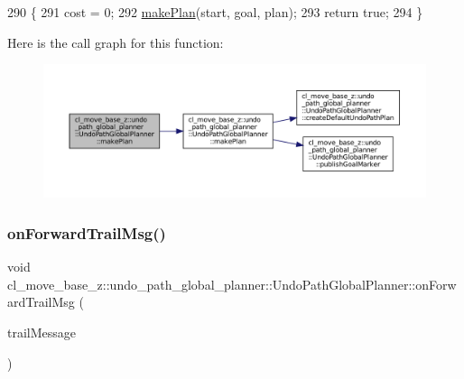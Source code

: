 \begin{DoxyCode}
290         \{
291             cost = 0;
292             \hyperlink{classcl__move__base__z_1_1undo__path__global__planner_1_1UndoPathGlobalPlanner_a46034d27c0811abae440009457a7f8b0}{makePlan}(start, goal, plan);
293             \textcolor{keywordflow}{return} \textcolor{keyword}{true};
294         \}
\end{DoxyCode}
Here is the call graph for this function\+:
\nopagebreak
\begin{figure}[H]
\begin{center}
\leavevmode
\includegraphics[width=350pt]{classcl__move__base__z_1_1undo__path__global__planner_1_1UndoPathGlobalPlanner_aca09f640e4bda4d5ccc9613276fd3f71_cgraph}
\end{center}
\end{figure}
\mbox{\label{classcl__move__base__z_1_1undo__path__global__planner_1_1UndoPathGlobalPlanner_ae5e3c5922ceb8783a6a01d904fc9c230}} 
\subsubsection{\texorpdfstring{on\+Forward\+Trail\+Msg()}{onForwardTrailMsg()}}
{\footnotesize\ttfamily void cl\+\_\+move\+\_\+base\+\_\+z\+::undo\+\_\+path\+\_\+global\+\_\+planner\+::\+Undo\+Path\+Global\+Planner\+::on\+Forward\+Trail\+Msg (\begin{DoxyParamCaption}\item[{const nav\+\_\+msgs\+::\+Path\+::\+Const\+Ptr \&}]{trail\+Message }\end{DoxyParamCaption})\hspace{0.3cm}{\ttfamily [private]}}

